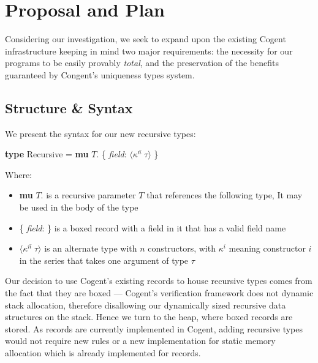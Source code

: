 \chapter{Proposal and Plan}\label{ch:style}

Considering our investigation, we seek to expand upon the existing Cogent infrastructure keeping in mind
two major requirements: the necessity for our programs to be easily provably \textit{total}, and the preservation 
of the benefits guaranteed by Congent's uniqueness types system.



\section{Structure \& Syntax}

We present the syntax for our new recursive types:

\begin{center}
    \textbf{type} Recursive = \textbf{mu} $T$. \{ \textit{field}: $\langle \overline{\kappa^n\; \tau} \rangle$ \}
\end{center}


Where:
\begin{itemize}
    \item
        \textbf{mu} $T$. is a recursive parameter $T$ that references the following type,
        It may be used in the body of the type
    \item
        \{ \textit{field}: \} is a boxed record with a field in it that has a valid field name
    \item 
        $\langle \overline{\kappa^n\; \tau} \rangle$ is an alternate type with $n$ constructors, 
        with $\kappa^i$ meaning constructor $i$ in the series that takes one argument of type $\tau$
\end{itemize}

Our decision to use Cogent's existing records to house recursive types comes from the fact that they are boxed ---
Cogent's verification framework does not dynamic stack allocation, therefore disallowing our dynamically sized 
recursive data structures on the stack. Hence we turn to the heap, where boxed records are stored.
As records are currently implemented in Cogent, adding recursive types would not require new rules
or a new implementation for static memory allocation which is already implemented for records.

